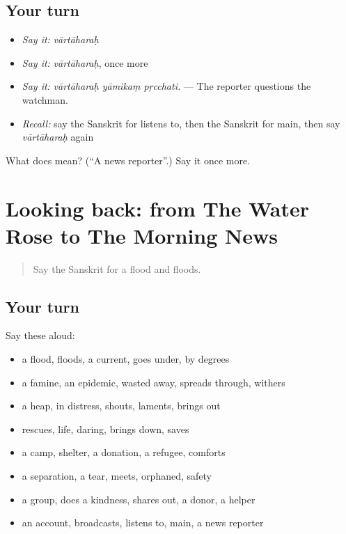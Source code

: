 \subsection*{Your turn}
\begin{itemize}
\raggedright
  \item \emph{Say it:} \emph{vārtāharaḥ}
  \item \emph{Say it:} \emph{vārtāharaḥ}, once more
  \item \emph{Say it:} \emph{vārtāharaḥ yāmikaṃ pṛcchati.} — The reporter questions the watchman.
  \item \emph{Recall:} say the Sanskrit for listens to, then the Sanskrit for main, then say \emph{vārtāharaḥ} again
\end{itemize}

\begin{tcolorbox}[breakable,colback=teal!4,colframe=teal!35!black,title={Before you move on}]
What does  mean? (\textquotedblleft{}A news reporter\textquotedblright{}.) Say it once more.
\end{tcolorbox}
\section[(dialogue)]{Looking back: from The Water Rose to The Morning News}

\label{lesson:SA-R309-review-302-309}



\begin{quote}
Say the Sanskrit for a flood and floods.
\end{quote}

\subsection*{Your turn}
Say these aloud:

\begin{itemize}
\raggedright
  \item a flood, floods, a current, goes under, by degrees
  \item a famine, an epidemic, wasted away, spreads through, withers
  \item a heap, in distress, shouts, laments, brings out
  \item rescues, life, daring, brings down, saves
  \item a camp, shelter, a donation, a refugee, comforts
  \item a separation, a tear, meets, orphaned, safety
  \item a group, does a kindness, shares out, a donor, a helper
  \item an account, broadcasts, listens to, main, a news reporter
\end{itemize}


